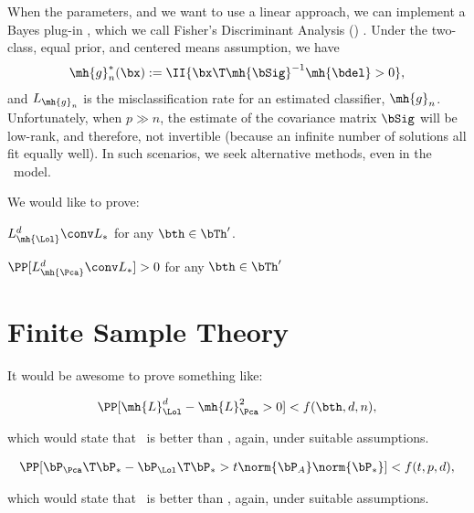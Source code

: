 \documentclass[10pt]{article}
\begin{document}
When the parameters, and we want to use a linear approach, we can implement a Bayes plug-in \Lda, which we call Fisher's Discriminant Analysis (\Fld) \cite{Fisher1925a}.  Under the two-class, equal prior, and centered means assumption, we have 
\begin{align}
\mh{g}^*_n(\bx) := \II\{ \bx\T \mh{\bSig}^{-1} \mh{\bdel} > 0 \},
\end{align}
and $L_{\mh{g}_n}$ is the misclassification rate for an estimated classifier, $\mh{g}_n$.
Unfortunately, when $p \gg n$, the estimate of the covariance matrix $\bSig$ will be low-rank, and therefore, not invertible (because an infinite number of solutions all fit equally well).  In such scenarios, we seek alternative methods, even in the \Lda~model.

We would like to prove:
\begin{lem}
$L_{\mh{\Lol}}^d \conv L_*$ for any $\bth \in \bTh'$.
\end{lem}


\begin{lem}
$\PP[L_{\mh{\Pca}}^d \conv L_*]>0$ for any $\bth \in \bTh'$
\end{lem}

\newpage
\section{Finite Sample Theory}

It would be awesome to prove something like:
\begin{thm}
\begin{align*}
\PP[ \mh{L}_{\Lol}^d - \mh{L}_{\Pca}^2  > 0  ] < f(\bth,d,n),
\end{align*}
\end{thm}
which would state that \Lol~is better than \Pca, again, under suitable assumptions.


\begin{thm}
\begin{align*}
\PP[ \bP_{\Pca} \T \bP_*  - \bP_{\Lol} \T \bP_*  > t \norm{\bP_A} \norm{\bP_*} ] < f(t,p,d),
\end{align*}
\end{thm}
which would state that \Lol~is better than \Pca, again, under suitable assumptions.
\end{document}
